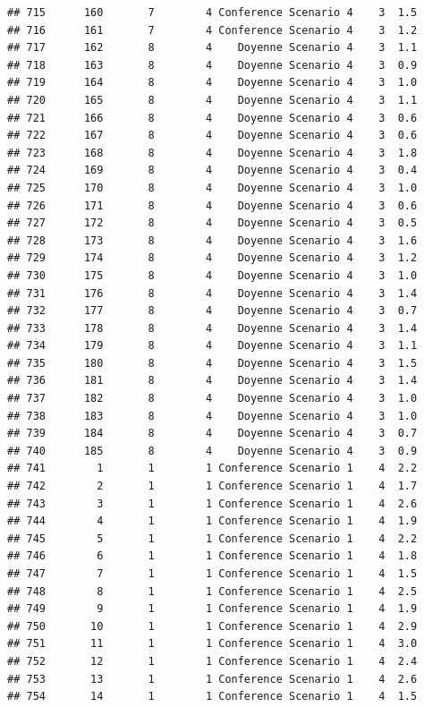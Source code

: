 \documentclass[
]{article}
\begin{document}
\begin{verbatim}
## 715      160       7        4 Conference Scenario 4    3  1.5
## 716      161       7        4 Conference Scenario 4    3  1.2
## 717      162       8        4    Doyenne Scenario 4    3  1.1
## 718      163       8        4    Doyenne Scenario 4    3  0.9
## 719      164       8        4    Doyenne Scenario 4    3  1.0
## 720      165       8        4    Doyenne Scenario 4    3  1.1
## 721      166       8        4    Doyenne Scenario 4    3  0.6
## 722      167       8        4    Doyenne Scenario 4    3  0.6
## 723      168       8        4    Doyenne Scenario 4    3  1.8
## 724      169       8        4    Doyenne Scenario 4    3  0.4
## 725      170       8        4    Doyenne Scenario 4    3  1.0
## 726      171       8        4    Doyenne Scenario 4    3  0.6
## 727      172       8        4    Doyenne Scenario 4    3  0.5
## 728      173       8        4    Doyenne Scenario 4    3  1.6
## 729      174       8        4    Doyenne Scenario 4    3  1.2
## 730      175       8        4    Doyenne Scenario 4    3  1.0
## 731      176       8        4    Doyenne Scenario 4    3  1.4
## 732      177       8        4    Doyenne Scenario 4    3  0.7
## 733      178       8        4    Doyenne Scenario 4    3  1.4
## 734      179       8        4    Doyenne Scenario 4    3  1.1
## 735      180       8        4    Doyenne Scenario 4    3  1.5
## 736      181       8        4    Doyenne Scenario 4    3  1.4
## 737      182       8        4    Doyenne Scenario 4    3  1.0
## 738      183       8        4    Doyenne Scenario 4    3  1.0
## 739      184       8        4    Doyenne Scenario 4    3  0.7
## 740      185       8        4    Doyenne Scenario 4    3  0.9
## 741        1       1        1 Conference Scenario 1    4  2.2
## 742        2       1        1 Conference Scenario 1    4  1.7
## 743        3       1        1 Conference Scenario 1    4  2.6
## 744        4       1        1 Conference Scenario 1    4  1.9
## 745        5       1        1 Conference Scenario 1    4  2.2
## 746        6       1        1 Conference Scenario 1    4  1.8
## 747        7       1        1 Conference Scenario 1    4  1.5
## 748        8       1        1 Conference Scenario 1    4  2.5
## 749        9       1        1 Conference Scenario 1    4  1.9
## 750       10       1        1 Conference Scenario 1    4  2.9
## 751       11       1        1 Conference Scenario 1    4  3.0
## 752       12       1        1 Conference Scenario 1    4  2.4
## 753       13       1        1 Conference Scenario 1    4  2.6
## 754       14       1        1 Conference Scenario 1    4  1.5

\end{verbatim}
\end{document}
